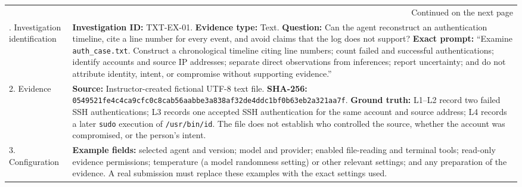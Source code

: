 \documentclass[12pt,letterpaper]{article}
\begin{document}
\begin{longtable}{|p{}|p{}|}
    \hline
    \endhead
    \hline
    \multicolumn{2}{r}{Continued on the next page}                                                                                                                                                                                                                                                                                                                                                                                                                                                                                                                                                                                            \\
    \endfoot
    \hline
    \endlastfoot
    \hline
    1. Investigation identification & \textbf{Investigation ID:} TXT-EX-01. \textbf{Evidence type:} Text. \textbf{Question:} Can the agent reconstruct an authentication timeline, cite a line number for every event, and avoid claims that the log does not support? \textbf{Exact prompt:} ``Examine \texttt{auth\_case.txt}. Construct a chronological timeline citing line numbers; count failed and successful authentications; identify accounts and source IP addresses; separate direct observations from inferences; report uncertainty; and do not attribute identity, intent, or compromise without supporting evidence.''        \\
    \hline
    2. Evidence                     & \textbf{Source:} Instructor-created fictional UTF-8 text file. \textbf{SHA-256:} \texttt{0549521f\allowbreak{}e4c4ca9c\allowbreak{}fc0c8cab\allowbreak{}56aabbe3\allowbreak{}a838af32\allowbreak{}de4ddc1b\allowbreak{}f0b63eb2\allowbreak{}a321aa7f}. \textbf{Ground truth:} L1--L2 record two failed SSH authentications; L3 records one accepted SSH authentication for the same account and source address; L4 records a later \texttt{sudo} execution of \texttt{/usr/bin/id}. The file does not establish who controlled the source, whether the account was compromised, or the person's intent. \\
    \hline
    3. Configuration                & \textbf{Example fields:} selected agent and version; model and provider; enabled file-reading and terminal tools; read-only evidence permissions; temperature (a model randomness setting) or other relevant settings; and any preparation of the evidence. A real submission must replace these examples with the exact settings used.                                                                                                                                                                                                                                                                 \\

\end{longtable}
\end{document}
